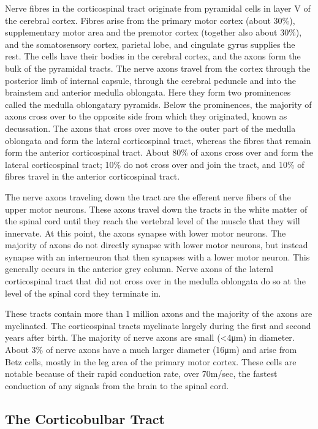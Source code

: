 Nerve fibres in the corticospinal tract originate from pyramidal cells in layer V of the cerebral cortex. Fibres arise from the primary motor cortex (about 30\%), supplementary motor area and the premotor cortex (together also about 30\%), and the somatosensory cortex, parietal lobe, and cingulate gyrus supplies the rest. The cells have their bodies in the cerebral cortex, and the axons form the bulk of the pyramidal tracts. The nerve axons travel from the cortex through the posterior limb of internal capsule, through the cerebral peduncle and into the brainstem and anterior medulla oblongata. Here they form two prominences called the medulla oblongatary pyramids. Below the prominences, the majority of axons cross over to the opposite side from which they originated, known as decussation. The axons that cross over move to the outer part of the medulla oblongata and form the lateral corticospinal tract, whereas the fibres that remain form the anterior corticospinal tract. About 80\% of axons cross over and form the lateral corticospinal tract; 10\% do not cross over and join the tract, and 10\% of fibres travel in the anterior corticospinal tract.

The nerve axons traveling down the tract are the efferent nerve fibers of the upper motor neurons. These axons travel down the tracts in the white matter of the spinal cord until they reach the vertebral level of the muscle that they will innervate. At this point, the axons synapse with lower motor neurons. The majority of axons do not directly synapse with lower motor neurons, but instead synapse with an interneuron that then synapses with a lower motor neuron. This generally occurs in the anterior grey column. Nerve axons of the lateral corticospinal tract that did not cross over in the medulla oblongata do so at the level of the spinal cord they terminate in.

These tracts contain more than 1 million axons and the majority of the axons are myelinated. The corticospinal tracts myelinate largely during the first and second years after birth. The majority of nerve axons are small (\textless{}4μm) in diameter. About 3\% of nerve axons have a much larger diameter (16μm) and arise from Betz cells, mostly in the leg area of the primary motor cortex. These cells are notable because of their rapid conduction rate, over 70m/sec, the fastest conduction of any signals from the brain to the spinal cord.

\hypertarget{the-corticobulbar-tract}{%
\subsection{The Corticobulbar Tract}\label{the-corticobulbar-tract}}

